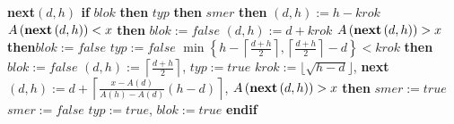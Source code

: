 {\bf next$\left(d,h\right)$\newline 
if} $blok$ {\bf then}\newline 
\phantom{---}{\bf if} $typ$ {\bf then}\newline 
\phantom{------}{\bf if} $smer$ {\bf then}\newline 
\phantom{---------}{\bf next}$\left(d,h\right):=h-krok$\newline 
\phantom{---------}{\bf if} $A\left(\text{{\bf next}}\left(d,h\right)\right)<x$ {\bf then}\newline
\phantom{------------}$blok:=false$\newline 
\phantom{---------}{\bf endif}\newline 
\phantom{------}{\bf else}\newline 
\phantom{---------}{\bf next}$\left(d,h\right):=d+krok$\newline 
\phantom{---------}{\bf if} $A\left(\text{{\bf next}}\left(d,h\right)\right)>x$ {\bf then}\newline \phantom{------------}$blok:=false$\newline 
\phantom{---------}{\bf endif}\newline 
\phantom{------}{\bf endif}\newline 
\phantom{------}$typ:=false$\newline 
\phantom{---}{\bf else}\newline 
\phantom{------}{\bf if} $\min\left\{h-\left\lceil\frac {d+h}2\right\rceil ,\left\lceil\frac {d+h}2\right\rceil-d\right\}<krok$ {\bf then}\newline 
\phantom{---------}$blok:=false$\newline 
\phantom{------}{\bf endif}\newline 
\phantom{------}{\bf next}$\left(d,h\right):=\left\lceil\frac {d+h}2\right\rceil$, $typ:=true$\newline 
\phantom{---}{\bf endif\newline 
else}\newline 
\phantom{---}$krok:=\lfloor\sqrt {h-d}\rfloor$, 
{\bf next$\left(d,h\right):=d+\left\lceil\frac {x-A\left(d\right)}{A\left(h\right)-A\left(d\right)}\left(h-d\right)\right\rceil$},\newline 
\phantom{---}{\bf if} $A\left(\text{{\bf next}}\left(d,h\right)\right)>x$ {\bf then}\newline 
\phantom{------}$smer:=true$\newline 
\phantom{---}{\bf else}\newline 
\phantom{------}$smer:=false$\newline 
\phantom{---}{\bf endif}\newline 
\phantom{---}$typ:=true$, $blok:=true$\newline 
{\bf endif}
\bigskip

